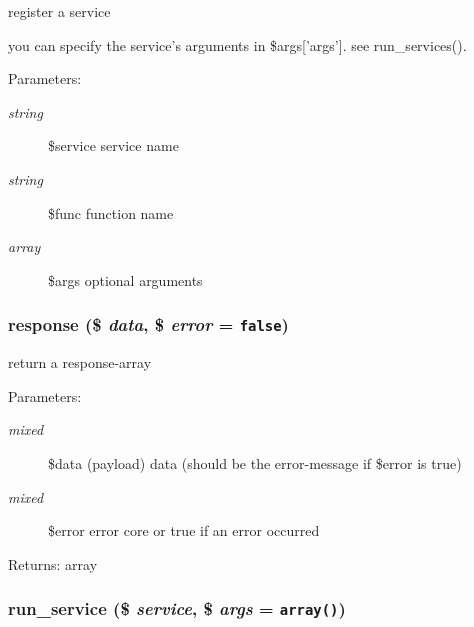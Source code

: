 register a service

you can specify the service's arguments in \$args\mbox{[}'args'\mbox{]}. see run\_\-services(). \begin{Desc}
\item[Parameters:]
\begin{description}
\item[{\em string}]\$service service name \item[{\em string}]\$func function name \item[{\em array}]\$args optional arguments \end{description}
\end{Desc}
\hypertarget{modules_8inc_8php_361058ff2a03c098045c4442440a2574}{
\subsubsection[{response}]{\setlength{\rightskip}{0pt plus 5cm}response (\$ {\em data}, \/  \$ {\em error} = {\tt false})}}
\label{modules_8inc_8php_361058ff2a03c098045c4442440a2574}


return a response-array

\begin{Desc}
\item[Parameters:]
\begin{description}
\item[{\em mixed}]\$data (payload) data (should be the error-message if \$error is true) \item[{\em mixed}]\$error error core or true if an error occurred \end{description}
\end{Desc}
\begin{Desc}
\item[Returns:]array \end{Desc}
\hypertarget{modules_8inc_8php_3d581f1636df2e24ffe7b013a12fb1db}{
\subsubsection[{run\_\-service}]{\setlength{\rightskip}{0pt plus 5cm}run\_\-service (\$ {\em service}, \/  \$ {\em args} = {\tt array()})}}
\label{modules_8inc_8php_3d581f1636df2e24ffe7b013a12fb1db}


